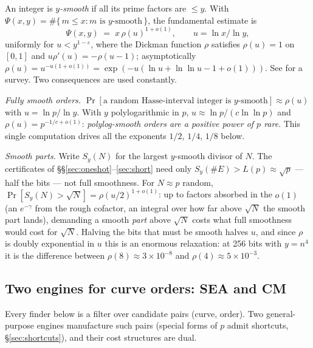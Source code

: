 \documentclass[11pt]{amsart}
\newcommand{\eps}{\varepsilon}
\newcommand{\smoothpart}[2]{S_{#1}(#2)}
\theoremstyle{plain}
\theoremstyle{definition}
\theoremstyle{remark}
\begin{document}
An integer is \emph{$y$-smooth} if all its prime factors are ${}\le y$.  With
$\Psi(x, y) = \#\{\,m \le x : m \text{ is } y\text{-smooth}\,\}$, the fundamental estimate
\cite{Dic30,CEP83,Hil86} is
\[
  \Psi(x, y) \;=\; x\,\rho(u)^{1+o(1)}, \qquad u = \ln x / \ln y,
\]
uniformly for $u < y^{1-\eps}$, where the Dickman function $\rho$ satisfies $\rho(u) = 1$ on $[0,1]$ and
$u\rho'(u) = -\rho(u-1)$; asymptotically
$\rho(u) = u^{-u(1+o(1))} = \exp(-u(\ln u + \ln\ln u - 1 + o(1)))$.  See \cite{Gran08} for a survey.
Two consequences are used constantly.

\emph{Fully smooth orders.}  $\Pr[\text{a random Hasse-interval integer is } y\text{-smooth}] \approx
\rho(u)$ with $u = \ln p/\ln y$.  With $y$ polylogarithmic in $p$,
$u \approx \ln p/(c\ln\ln p)$ and $\rho(u) = p^{-1/c+o(1)}$: \emph{polylog-smooth orders are a positive
power of $p$ rare}.  This single computation drives all the exponents $1/2$, $1/4$, $1/8$ below.

\emph{Smooth parts.}  Write $\smoothpart{y}{N}$ for the largest $y$-smooth divisor of $N$.  The
certificates of \S\S\ref{sec:oneshot}--\ref{sec:short} need only
$\smoothpart{y}{\#E} > L(p) \approx \sqrt p$ --- half the bits --- not full smoothness.  For
$N \approx p$ random, $\Pr[\smoothpart{y}{N} > \sqrt N] = \rho(u/2)^{1+o(1)}$: up to factors absorbed in
the $o(1)$ (an $e^{-\gamma}$ from the rough cofactor, an integral over how far above $\sqrt N$ the
smooth part lands), demanding a smooth \emph{part} above $\sqrt N$ costs what full smoothness would cost
for $\sqrt N$.  Halving the bits that must be smooth halves $u$, and since $\rho$ is doubly exponential
in $u$ this is an enormous relaxation: at 256 bits with $y = n^4$ it is the difference between
$\rho(8) \approx 3\times 10^{-8}$ and $\rho(4) \approx 5\times 10^{-3}$.

\subsection{Two engines for curve orders: SEA and CM}\label{sec:engines}

Every finder below is a filter over candidate pairs (curve, order).  Two general-purpose engines
manufacture such pairs (special forms of $p$ admit shortcuts, \S\ref{sec:shortcuts}), and their cost
structures are dual.
\end{document}
